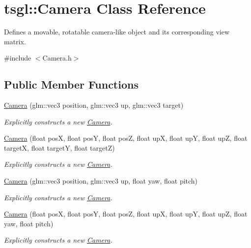 \hypertarget{classtsgl_1_1_camera}{}\section{tsgl\+:\+:Camera Class Reference}
\label{classtsgl_1_1_camera}


Defines a movable, rotatable camera-\/like object and its corresponding view matrix.  




{\ttfamily \#include $<$Camera.\+h$>$}

\subsection*{Public Member Functions}
\begin{DoxyCompactItemize}
\item 
\hyperlink{classtsgl_1_1_camera_ad55c777a783afe64666b22c4867a2ac0}{Camera} (glm\+::vec3 position, glm\+::vec3 up, glm\+::vec3 target)
\begin{DoxyCompactList}\small\item\em Explicitly constructs a new \hyperlink{classtsgl_1_1_camera}{Camera}. \end{DoxyCompactList}\item 
\hyperlink{classtsgl_1_1_camera_a3024adf593e6097eff73152305af9dee}{Camera} (float posX, float posY, float posZ, float upX, float upY, float upZ, float targetX, float targetY, float targetZ)
\begin{DoxyCompactList}\small\item\em Explicitly constructs a new \hyperlink{classtsgl_1_1_camera}{Camera}. \end{DoxyCompactList}\item 
\hyperlink{classtsgl_1_1_camera_a19bf2769862005ac36d7bacce3ec8400}{Camera} (glm\+::vec3 position, glm\+::vec3 up, float yaw, float pitch)
\begin{DoxyCompactList}\small\item\em Explicitly constructs a new \hyperlink{classtsgl_1_1_camera}{Camera}. \end{DoxyCompactList}\item 
\hyperlink{classtsgl_1_1_camera_ad4263c9f9805ab92dd3996a2738dad8b}{Camera} (float posX, float posY, float posZ, float upX, float upY, float upZ, float yaw, float pitch)
\begin{DoxyCompactList}\small\item\em Explicitly constructs a new \hyperlink{classtsgl_1_1_camera}{Camera}. \end{DoxyCompactList}\item 

\end{DoxyCompactItemize}
